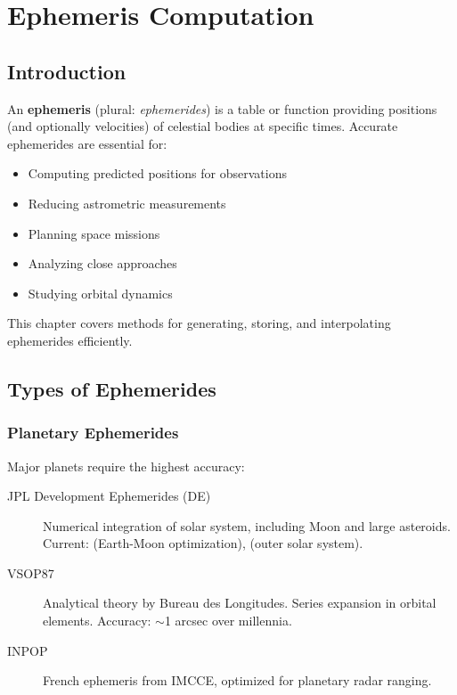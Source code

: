 \chapter{Ephemeris Computation}
\label{ch:ephemeris}

\section{Introduction}

An \textbf{ephemeris} (plural: \emph{ephemerides}) is a table or function providing positions (and optionally velocities) of celestial bodies at specific times. Accurate ephemerides are essential for:

\begin{itemize}
    \item Computing predicted positions for observations
    \item Reducing astrometric measurements
    \item Planning space missions
    \item Analyzing close approaches
    \item Studying orbital dynamics
\end{itemize}

This chapter covers methods for generating, storing, and interpolating ephemerides efficiently.

\section{Types of Ephemerides}

\subsection{Planetary Ephemerides}

Major planets require the highest accuracy:

\begin{description}
    \item[JPL Development Ephemerides (DE)] Numerical integration of solar system, including Moon and large asteroids. Current:  (Earth-Moon optimization),  (outer solar system).
    
    \item[VSOP87] Analytical theory by Bureau des Longitudes. Series expansion in orbital elements. Accuracy: $\sim$1 arcsec over millennia.
    
    \item[INPOP] French ephemeris from IMCCE, optimized for planetary radar ranging.
\end{description}

